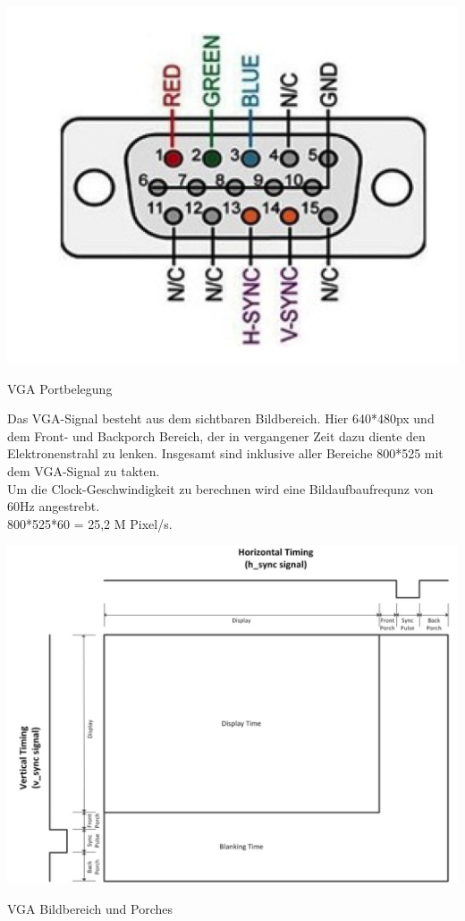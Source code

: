 \begin{minipage}{\textwidth}
    \begin{center}        
        \includegraphics[scale=0.5]{img/vgaport.png} 
    \end{center}
\end{minipage}
\begin{center}
VGA Portbelegung
\end{center}

Das VGA-Signal besteht aus dem sichtbaren Bildbereich. Hier 640*480px und dem Front- und Backporch Bereich, der in vergangener 
Zeit dazu diente den Elektronenstrahl zu lenken. Insgesamt sind inklusive aller Bereiche 800*525 mit dem VGA-Signal zu takten.\\
Um die Clock-Geschwindigkeit zu berechnen wird eine Bildaufbaufrequnz von 60Hz angestrebt. \\
800*525*60 = 25,2 M Pixel/s.\\

\begin{minipage}{\textwidth}
    \begin{center}        
        \includegraphics[scale=0.5]{img/porch.png} 
    \end{center}
\end{minipage}
\begin{center}
VGA Bildbereich und Porches
\end{center}

